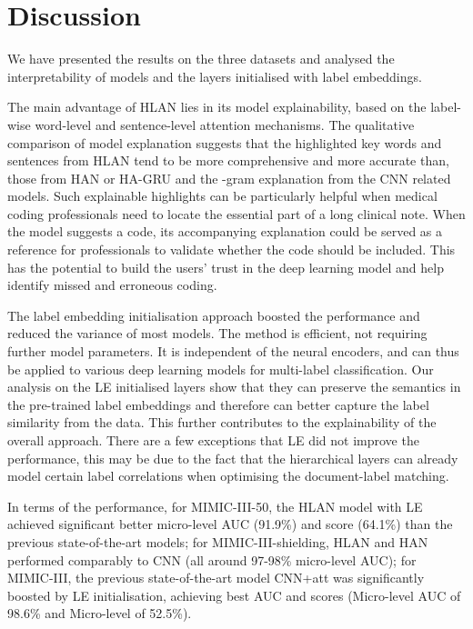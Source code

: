 \documentclass[final,5p,times,twocolumn]{elsarticle}
\begin{document}
\section{Discussion}
\label{discussion}
We have presented the results on the three datasets and analysed the interpretability of models and the layers initialised with label embeddings.

The main advantage of HLAN lies in its model explainability, based on the label-wise word-level and sentence-level attention mechanisms. The qualitative comparison of model explanation suggests that the highlighted key words and sentences from HLAN tend to be more comprehensive and more accurate than, those from HAN or HA-GRU and the -gram explanation from the CNN related models. Such explainable highlights can be particularly helpful when medical coding professionals need to locate the essential part of a long clinical note. When the model suggests a code, its accompanying explanation could be served as a reference for professionals to validate whether the code should be included. This has the potential to build the users' trust in the deep learning model and help identify missed and erroneous coding.

The label embedding initialisation approach boosted the performance and reduced the variance of most models. The method is efficient, not requiring further model parameters. It is independent of the neural encoders, and can thus be applied to various deep learning models for multi-label classification. Our analysis on the LE initialised layers show that they can preserve the semantics in the pre-trained label embeddings and therefore can better capture the label similarity from the data. This further contributes to the explainability of the overall approach. There are a few exceptions that LE did not improve the performance, this may be due to the fact that the hierarchical layers can already model certain label correlations when optimising the document-label matching.

In terms of the performance, for MIMIC-III-50, the HLAN model with LE achieved significant better micro-level AUC (91.9\%) and  score (64.1\%) than the previous state-of-the-art models; for MIMIC-III-shielding, HLAN and HAN performed comparably to CNN (all around 97-98\% micro-level AUC); for MIMIC-III, the previous state-of-the-art model CNN+att was significantly boosted by LE initialisation, achieving best AUC and  scores (Micro-level AUC of 98.6\% and Micro-level  of 52.5\%).
\end{document}
